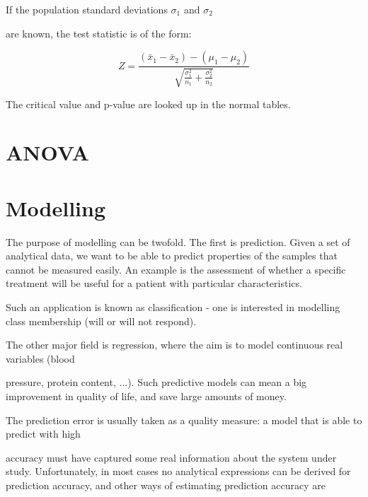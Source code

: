 

If the population standard deviations $\sigma_1$ and $\sigma_2$

are known, the test statistic is of the form:

 

\begin{equation}

Z = \frac{(\bar{x}_1 - \bar{x}_2) - (\mu_1 - \mu_2 ) }{\sqrt{

\frac{\sigma^2_1}{n_1}+\frac{\sigma^2_2}{n_2}} }

\end{equation}

The critical value and p-value are looked up in the normal tables.

 


\section{ANOVA}

 

\section{Modelling}

 

The purpose of modelling can be twofold. The first is prediction. Given a set of analytical data, we want to be able to predict properties of the samples that cannot be measured easily. An example is the assessment of whether a specific treatment will be useful for a patient with particular characteristics.

 

Such an application is known as classification - one is interested in modelling class membership (will or will not respond).

 

The other major field is regression, where the aim is to model continuous real variables (blood

pressure, protein content, ...). Such predictive models can mean a big improvement in quality of life, and save large amounts of money.

 

The prediction error is usually taken as a quality measure: a model that is able to predict with high

accuracy must have captured some real information about the system under study. Unfortunately, in most cases no analytical expressions can be derived for prediction accuracy, and other ways of estimating prediction accuracy are

